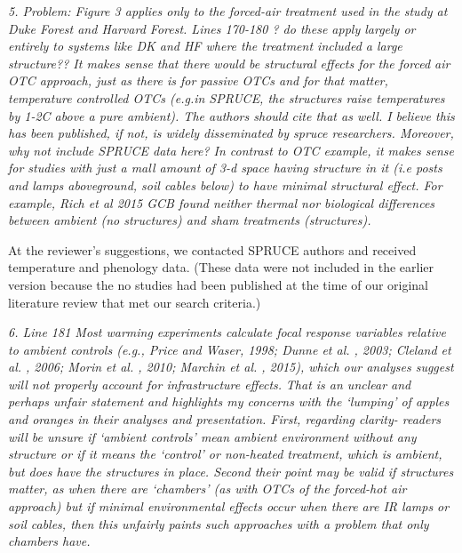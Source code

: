 \documentclass[11pt,a4paper]{letter}
\begin{document}
\begin{letter}{}
\emph{5. Problem: Figure 3 applies only to the forced-air treatment used in the study at Duke Forest and Harvard Forest. Lines 170-180 ? do these apply largely or entirely to systems like DK and HF where the treatment included a large structure?? It makes sense that there would be structural effects for the forced air OTC approach, just as there is for passive OTCs and for that matter, temperature controlled OTCs (e.g.in SPRUCE, the structures raise temperatures by 1-2C above a pure ambient). The authors should cite that as well. I believe this has been published, if not, is widely disseminated by spruce researchers. Moreover, why not include SPRUCE data here? In contrast to OTC example, it makes sense for studies with just a  mall amount of 3-d space having structure in it (i.e posts and lamps aboveground, soil cables below) to have minimal structural effect. For example, Rich et al 2015 GCB found neither thermal nor biological differences between ambient (no structures) and sham treatments (structures).}
\par At the reviewer's suggestions, we contacted SPRUCE authors and received temperature and phenology data. (These data were not included in the earlier version because the no studies had been published at the time of our original literature review that met our search criteria.) 

\par \emph{6. Line 181 Most warming experiments calculate focal response variables relative to ambient controls (e.g., Price and Waser, 1998; Dunne et al. , 2003; Cleland et al. , 2006; Morin et al. , 2010; Marchin et al. , 2015), which our analyses suggest will not properly account for infrastructure effects.}
\emph{That is an unclear and perhaps unfair statement and highlights my concerns with the `lumping' of apples and oranges in their analyses and presentation. First, regarding clarity- readers will be unsure if `ambient controls' mean ambient environment without any structure or if it means the `control' or non-heated treatment, which is ambient, but does have the structures in place. Second their point may be valid if structures matter, as when there are `chambers' (as with OTCs of the forced-hot air approach) but if minimal environmental effects occur when there are IR lamps or soil cables, then this unfairly paints such approaches with a problem that only chambers have.}


\end{letter}
\end{document}
